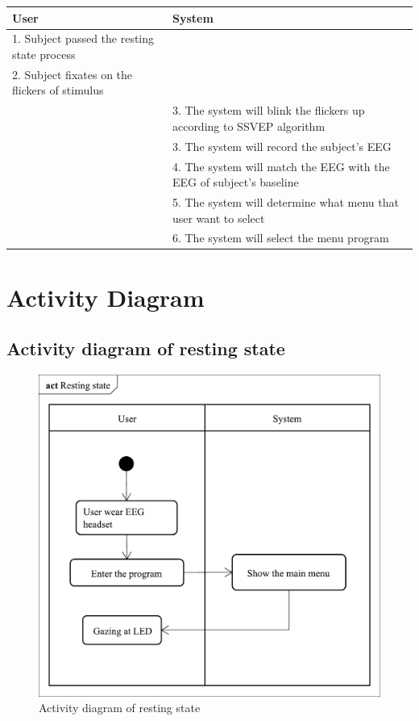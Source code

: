 \begin{itemize}
\begin{description}
{\begin{tabular}{| m{.47\linewidth} | m{.47\linewidth} |}
			\hline 
			\textbf{User} & \textbf{System}  \\
			\hline 
			1. Subject passed the resting state process &   \\
			\hline 
			2. Subject fixates on the flickers of stimulus   &   \\
            \hline 
			& 3. The system will blink the flickers up according to SSVEP algorithm \\
			\hline 
			& 3. The system will record the subject’s EEG \\
			\hline 
			& 4. The system will match the EEG with the EEG of subject’s baseline  \\
			\hline
			& 5. The system will determine what menu that user want to select \\
			\hline
			& 6. The system will select the menu program\\
			\hline
			
		\end{tabular}
	}
	
\end{description}
\end{itemize}


\section{Activity Diagram}


\subsection{Activity diagram of resting state}

\begin{figure}[ht]
\centering \includegraphics[scale=0.295]{chapter4/Rest.pdf}
\caption{Activity diagram of resting state}
\end{figure}




